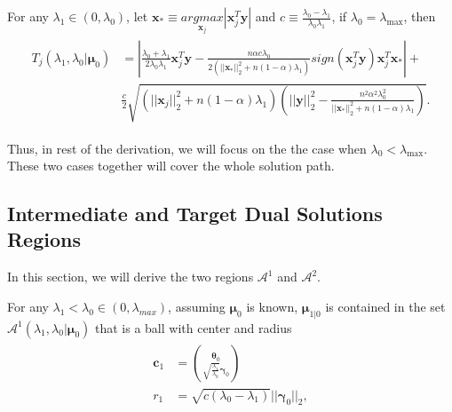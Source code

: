 \begin{theorem}
    \label{thm:0.1}
    For any $\lambda_1\in(0,\lambda_{0})$, let $\boldsymbol x_*\equiv\underset{\boldsymbol x_j}{argmax}|\boldsymbol x_j^T\boldsymbol y|$ and $c\equiv \frac{\lambda_{0}-\lambda_1}{\lambda_{0}\lambda_1}$, if $\lambda_0=\lambda_{\max}$, then
    \begin{gather}
        \begin{aligned}
            T_j(\lambda_{1},\lambda_{0}|\boldsymbol\mu_0)&=\left|\frac{\lambda_{0}+\lambda_1}{2\lambda_{0}\lambda_1}\boldsymbol x_j^T\boldsymbol y-\frac{n\alpha c\lambda_{0}}{2(||\boldsymbol x_*||_2^2+n(1-\alpha)\lambda_1)}\textit{sign}(\boldsymbol x_j^T\boldsymbol y) \boldsymbol x_j^T\boldsymbol x_*\right|+\\
            &\frac{c}{2}\sqrt{\left(||\boldsymbol x_j||_2^2+n(1-\alpha)\lambda_1\right)\left(||\boldsymbol y||_2^2-\frac{n^2\alpha^2\lambda_{0}^2}{||\boldsymbol x_*||_2^2+n(1-\alpha)\lambda_1}\right)}.
        \end{aligned}
    \end{gather}
\end{theorem}

Thus, in rest of the derivation, we will focus on the the case when $\lambda_0<\lambda_{\max}$. These two cases together will cover the whole solution path.

\subsection{Intermediate and Target Dual Solutions Regions}

In this section, we will derive the two regions $\mathcal{A}^1$ and $\mathcal{A}^2$.

\begin{theorem}
    \label{thm:1.1}
    For any $\lambda_1<\lambda_{0}\in (0,\lambda_{max})$, assuming $\boldsymbol\mu_0$ is known, $\boldsymbol\mu_{1|0}$ is contained in the set $\mathcal{A}^1(\lambda_1,\lambda_0|\boldsymbol\mu_0)$ that is a ball with center and radius
    \begin{gather}
        \begin{aligned}
            \boldsymbol c_1&=\binom{\boldsymbol\theta_0}{\sqrt{\frac{\lambda_1}{\lambda_0}}\boldsymbol\gamma_0}\\
            r_1&=\sqrt{c(\lambda_0-\lambda_1)}||\boldsymbol\gamma_0||_2,
        \end{aligned}
    \end{gather}
\end{theorem}


